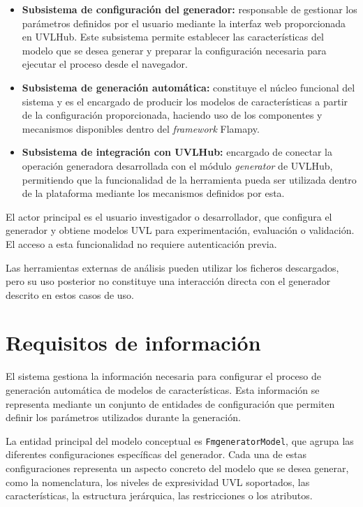 \begin{itemize}

    \item \textbf{Subsistema de configuración del generador:} responsable de gestionar los parámetros definidos por el usuario mediante la interfaz web proporcionada en UVLHub. Este subsistema permite establecer las características del modelo que se desea generar y preparar la configuración necesaria para ejecutar el proceso desde el navegador.

    \item \textbf{Subsistema de generación automática:} constituye el núcleo funcional del sistema y es el encargado de producir los modelos de características a partir de la configuración proporcionada, haciendo uso de los componentes y mecanismos disponibles dentro del \textit{framework} Flamapy.

    \item \textbf{Subsistema de integración con UVLHub:} encargado de conectar la operación generadora desarrollada con el módulo \textit{generator} de UVLHub, permitiendo que la funcionalidad de la herramienta pueda ser utilizada dentro de la plataforma mediante los mecanismos definidos por esta.

\end{itemize}

El actor principal es el usuario investigador o desarrollador, que
configura el generador y obtiene modelos UVL para experimentación,
evaluación o validación. El acceso a esta funcionalidad no requiere
autenticación previa.

Las herramientas externas de análisis pueden utilizar los ficheros
descargados, pero su uso posterior no constituye una interacción
directa con el generador descrito en estos casos de uso.

\section{Requisitos de información}
\label{sec:ri}



El sistema gestiona la información necesaria para configurar el proceso de generación automática de modelos de características. Esta información se representa mediante un conjunto de entidades de configuración que permiten definir los parámetros utilizados durante la generación.

La entidad principal del modelo conceptual es \texttt{FmgeneratorModel}, que agrupa las diferentes configuraciones específicas del generador. Cada una de estas configuraciones representa un aspecto concreto del modelo que se desea generar, como la nomenclatura, los niveles de expresividad UVL soportados, las características, la estructura jerárquica, las restricciones o los atributos.

